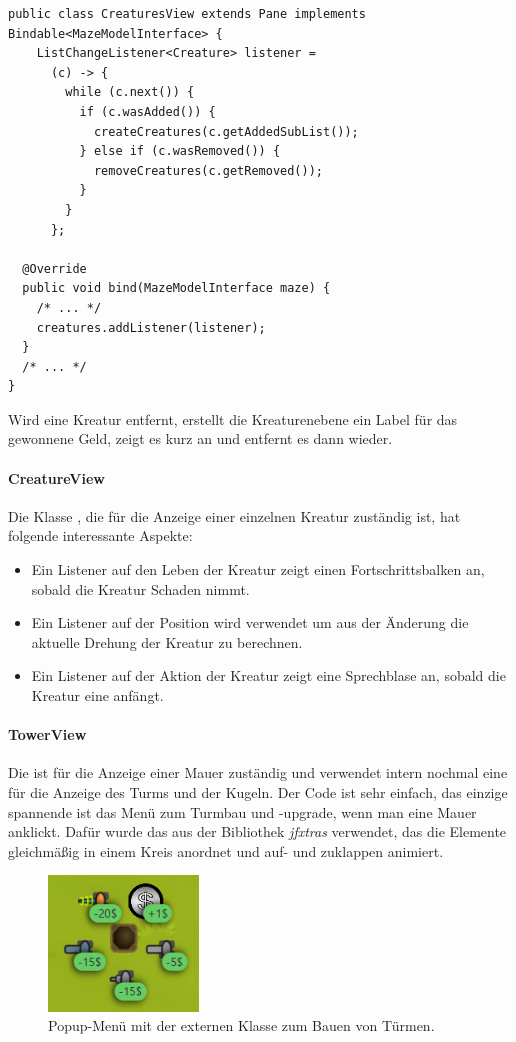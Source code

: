 \begin{lstlisting}
public class CreaturesView extends Pane implements Bindable<MazeModelInterface> {
    ListChangeListener<Creature> listener =
      (c) -> {
        while (c.next()) {
          if (c.wasAdded()) {
            createCreatures(c.getAddedSubList());
          } else if (c.wasRemoved()) {
            removeCreatures(c.getRemoved());
          }
        }
      };

  @Override
  public void bind(MazeModelInterface maze) {
    /* ... */
    creatures.addListener(listener);
  }
  /* ... */
}
\end{lstlisting}
Wird eine Kreatur entfernt, erstellt die Kreaturenebene ein Label für das gewonnene Geld, zeigt es kurz an und entfernt es dann wieder.

\paragraph{CreatureView}
Die Klasse , die für die Anzeige einer einzelnen Kreatur zuständig ist, hat folgende interessante Aspekte:
\begin{itemize}
  \item Ein Listener auf den Leben der Kreatur zeigt einen Fortschrittsbalken an, sobald die Kreatur Schaden nimmt. 
  \item Ein Listener auf der Position wird verwendet um aus der Änderung die aktuelle Drehung der Kreatur zu berechnen. 
  \item Ein Listener auf der Aktion der Kreatur zeigt eine Sprechblase an, sobald die Kreatur eine  anfängt.
\end{itemize}

\paragraph{TowerView}
Die  ist für die Anzeige einer Mauer zuständig und verwendet intern nochmal eine  für die Anzeige des Turms und der Kugeln. Der Code ist sehr einfach, das einzige spannende ist das Menü zum Turmbau und -upgrade, wenn man eine Mauer anklickt. Dafür wurde das  aus der Bibliothek \emph{jfxtras} verwendet, das die Elemente gleichmäßig in einem Kreis anordnet und auf- und zuklappen animiert.
\begin{figure}[htb]
  \centering
  \includegraphics[width=4cm]{images/klick-turm.png}
  \caption{Popup-Menü mit der externen Klasse  zum Bauen von Türmen.}
\end{figure}

